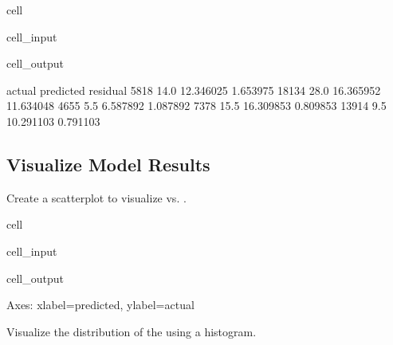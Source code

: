 \documentclass[letterpaper,10pt,english]{sphinxmanual}
\begin{document}
\begin{sphinxuseclass}{cell}
\begin{sphinxuseclass}{cell_input}
\begin{sphinxVerbatim}[commandchars=\\\{\}]
\end{sphinxVerbatim}

\end{sphinxuseclass}
\begin{sphinxuseclass}{cell_output}
\begin{sphinxVerbatim}[commandchars=\\\{\}]
       actual  predicted   residual
5818     14.0  12.346025   1.653975
18134    28.0  16.365952  11.634048
4655      5.5   6.587892  \PYGZhy{}1.087892
7378     15.5  16.309853  \PYGZhy{}0.809853
13914     9.5  10.291103  \PYGZhy{}0.791103
\end{sphinxVerbatim}

\end{sphinxuseclass}
\end{sphinxuseclass}

\subsection{Visualize Model Results}
\label{\detokenize{Automatidata_Regression Analysis:visualize-model-results}}
\sphinxAtStartPar
Create a scatterplot to visualize  vs. .

\begin{sphinxuseclass}{cell}
\begin{sphinxuseclass}{cell_input}
\begin{sphinxVerbatim}[commandchars=\\\{\}]
    
\end{sphinxVerbatim}

\end{sphinxuseclass}
\begin{sphinxuseclass}{cell_output}
\begin{sphinxVerbatim}[commandchars=\\\{\}]
\PYGZlt{}Axes: xlabel=\PYGZsq{}predicted\PYGZsq{}, ylabel=\PYGZsq{}actual\PYGZsq{}\PYGZgt{}
\end{sphinxVerbatim}

\noindent{}

\end{sphinxuseclass}
\end{sphinxuseclass}
\sphinxAtStartPar
Visualize the distribution of the  using a histogram.
\end{document}
